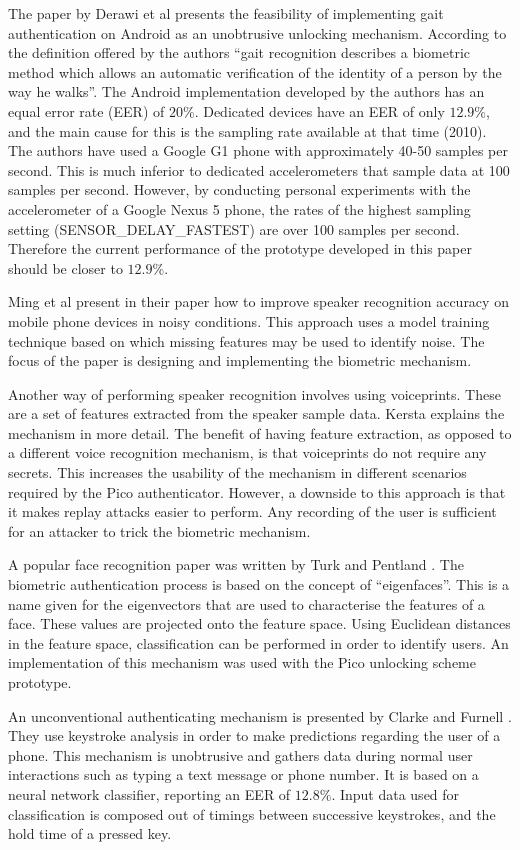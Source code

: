 The paper by Derawi et al \cite{derawi2010unobtrusive} presents the feasibility of implementing gait authentication on Android as an unobtrusive unlocking mechanism. According to the definition offered by the authors ``gait recognition describes a biometric method which allows an automatic verification of the identity of a person by the way he walks''. The Android implementation developed by the authors has an equal error rate (EER) of $20\%$. Dedicated devices have an EER of only $12.9\%$, and the main cause for this is the sampling rate available at that time (2010). The authors have used a Google G1 phone with approximately 40-50 samples per second. This is much inferior to dedicated accelerometers that sample data at 100 samples per second. However, by conducting personal experiments with the accelerometer of a Google Nexus 5 phone, the rates of the highest sampling setting (SENSOR\_DELAY\_FASTEST) are over 100 samples per second. Therefore the current performance of the prototype developed in this paper should be closer to $12.9\%$.

Ming et al \cite{ming2007robust} present in their paper how to improve speaker recognition accuracy on mobile phone devices in noisy conditions. This approach uses a model training technique based on which missing features may be used to identify noise. The focus of the paper is designing and implementing the biometric mechanism.

Another way of performing speaker recognition involves using voiceprints. These are a set of features extracted from the speaker sample data. Kersta \cite{kersta2005voiceprint} explains the mechanism in more detail. The benefit of having feature extraction, as opposed to a different voice recognition mechanism, is that voiceprints do not require any secrets. This increases the usability of the mechanism in different scenarios required by the Pico authenticator. However, a downside to this approach is that it makes replay attacks easier to perform. Any recording of the user is sufficient for an attacker to trick the biometric mechanism.

A popular face recognition paper was written by Turk and Pentland \cite{turk1991face}. The biometric authentication process is based on the concept of ``eigenfaces''. This is a name given for the eigenvectors that are used to characterise the features of a face. These values are projected onto the feature space. Using Euclidean distances in the feature space, classification can be performed in order to identify users. An implementation of this mechanism was used with the Pico unlocking scheme prototype.

An unconventional authenticating mechanism is presented by Clarke and Furnell \cite{clarke2007authenticating}. They use keystroke analysis in order to make predictions regarding the user of a phone. This mechanism is unobtrusive and gathers data during normal user interactions such as typing a text message or phone number. It is based on a neural network classifier, reporting an EER of $12.8\%$. Input data used for classification is composed out of timings between successive keystrokes, and the hold time of a pressed key. 
